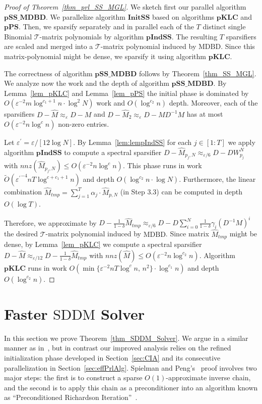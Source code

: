 \documentclass[11pt]{article}
\newcommand{\SDDM}{\mathrm{SDDM}}
\newcommand{\MDBD}{\mathrm{MDBD}}
\newcommand{\GL}{\mathcal{T}}
\newcommand{\pKLC}{\mathrm{\mathbf{pKLC}}}
\newcommand{\InitSS}{\mathrm{\mathbf{InitSS}}}
\newcommand{\pIndSS}{\mathrm{\mathbf{pIndSS}}}
\newcommand{\pSSMDBD}{\mathrm{\mathbf{pSS\_MDBD}}}
\newcommand{\pPS}{\mathbf{pPS}}
\newcommand{\wO}{\widetilde{O}}
\newcommand{\hM}{\widehat{M}}
\newcommand{\Di}{D^{-1}}
\newcommand{\prm}{\prime}
\newcommand{\eps}{\epsilon}
\renewcommand{\leq}{\leqslant}
\newcommand{\lemref}[1]{Lemma~\ref{lem:#1}}
\renewcommand{\eps}{\varepsilon}
\numberwithin{thm}{section}
\begin{document}
\begin{proof}[Proof of Theorem~\ref{thm_prl_SS_MGL}]
We sketch first our parallel algorithm $\pSSMDBD$. We parallelize algorithm $\InitSS$ based on algorithms $\pKLC$ and $\pPS$. Then, we sparsify separately and in parallel each of the $T$ distinct single Binomial $\GL$-matrix polynomials by algorithm $\pIndSS$. The resulting $T$ sparsifiers are scaled and merged into a $\GL$-matrix polynomial induced by $\MDBD$. Since this matrix-polynomial might be dense, we sparsify it using algorithm $\pKLC$.

The correctness of algorithm $\pSSMDBD$ follows by Theorem~\ref{thm_SS_MGL}. We analyze now the work and the depth of algorithm $\pSSMDBD$. By Lemma~\ref{lem_pKLC} and Lemma~\ref{lem_pPS} the initial phase is dominated by $O(\eps^{-2}m\log^{c_1+1}n\cdot\log^{2}N)$ work and $O(\log^{c_2}n)$ depth. Moreover, each of the sparsifiers $D-\hM \approx_{\eps}D-M$ and $D-\hM_{2}\approx_{\eps}D-M\Di M$ has at most $O(\eps^{-2}n\log^{c}n)$ non-zero entries.

Let $\eps^{\prm}=\eps/[12\log N]$. By \lemref{lempIndSS} for each $j\in[1:T]$ we apply algorithm $\pIndSS$ to compute a spectral sparsifier $D-\hM_{p_j,N}\approx_{\eps/6}D-DW_{p_j}^{N}$ with $nnz(\hM_{p_j,N})\leq O(\eps^{-2}n\log^{c}n)$. This phase runs in work $\wO({\eps^{\prm}}^{-4}nT\log^{c+c_1+1}n)$ and depth $O(\log^{c_2}n\cdot\log N)$. Furthermore, the linear combination $\hM_{tmp}=\sum_{j=1}^{T}\alpha_{j}\cdot\hM_{p,N}$ (in Step 3.3) can be computed in depth $O(\log T)$.

Therefore, we approximate by $D-\frac{1}{1-\delta}\hM_{tmp}\approx_{\eps/6} D-D\sum_{i=0}^{N}\frac{1}{1-\delta}\gamma_{i}(\Di M)^{i}$ the desired $\GL$-matrix polynomial induced by $\MDBD$. Since matrix $\hM_{tmp}$ might be dense, by Lemma~\ref{lem_pKLC} we compute a spectral sparsifier $D-\hM \approx_{\eps/12}D - \frac{1}{1-\delta}\hM_{tmp}$ with $nnz(\hM)\leq O(\eps^{-2}n\log^{c_2}n)$. Algorithm $\pKLC$ runs in work
$O(\min\{\eps^{-2}nT\log^{c}n,\,n^2\}\cdot\log^{c_1}n)$ and depth $O(\log^{c_2}n)$.
\end{proof}


\section{Faster $\SDDM$ Solver}\label{sec:SDDMSolver}

In this section we prove Theorem~\ref{thm_SDDM_Solver}. We argue in a similar manner as in~\cite{PS14}, but in contrast our improved analysis relies on the refined initialization phase developed in Section~\ref{sec:CIA} and its consecutive parallelization in Section~\ref{sec:effPrlAlg}. Spielman and Peng's~\cite{PS14} proof involves two major steps: the first is to construct a sparse $O(1)$-approximate inverse chain, and the second is to apply this chain as a preconditioner into an algorithm known as ``Preconditioned Richardson Iteration''~\cite[Lemma 4.4]{PS14}.
\end{document}
